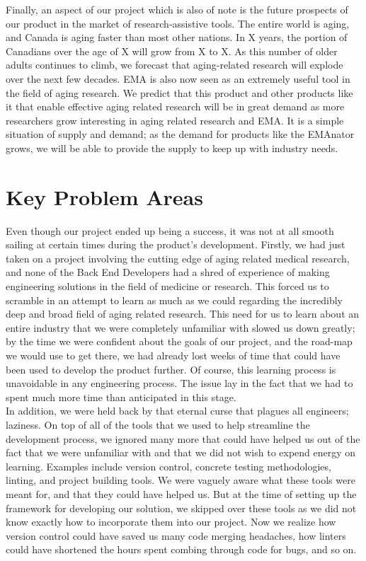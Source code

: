 \documentclass{article}
\begin{document}
Finally, an aspect of our project which is also of note is the future prospects of our product in the market of research-assistive tools. The entire world is aging, and Canada is aging faster than most other nations. In X years, the portion of Canadians over the age of X will grow from X to X. As this number of older adults continues to climb, we forecast that aging-related research will explode over the next few decades. EMA is also now seen as an extremely useful tool in the field of aging research. We predict that this product and other products like it that enable effective aging related research will be in great demand as more researchers grow interesting in aging related research and EMA. It is a simple situation of supply and demand; as the demand for products like the EMAnator grows, we will be able to provide the supply to keep up with industry needs.\\

\section{Key Problem Areas}

Even though our project ended up being a success, it was not at all smooth sailing at certain times during the product's development. Firstly, we had just taken on a project involving the cutting edge of aging related medical research, and none of the Back End Developers had a shred of experience of making engineering solutions in the field of medicine or research. This forced us to scramble in an attempt to learn as much as we could regarding the incredibly deep and broad field of aging related research. This need for us to learn about an entire industry that we were completely unfamiliar with slowed us down greatly; by the time we were confident about the goals of our project, and the road-map we would use to get there, we had already lost weeks of time that could have been used to develop the product further. Of course, this learning process is unavoidable in any engineering process. The issue lay in the fact that we had to spent much more time than anticipated in this stage.\\

In addition, we were held back by that eternal curse that plagues all engineers; laziness. On top of all of the tools that we used to help streamline the development process, we ignored many more that could have helped us out of the fact that we were unfamiliar with and that we did not wish to expend energy on learning. Examples include version control, concrete testing methodologies, linting, and project building tools. We were vaguely aware what these tools were meant for, and that they could have helped us. But at the time of setting up the framework for developing our solution, we skipped over these tools as we did not know exactly how to incorporate them into our project. Now we realize how version control could have saved us many code merging headaches, how linters could have shortened the hours spent combing through code for bugs, and so on.\\
\end{document}
